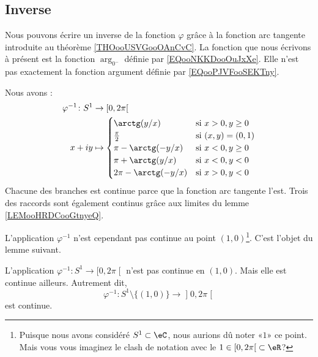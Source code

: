\subsection{Inverse}
\label{SUBSECooWFNMooOuZBRN}

Nous pouvons écrire un inverse de la fonction \( \varphi\) grâce à la fonction arc tangente introduite au théorème \ref{THOooUSVGooOAnCvC}.
La fonction que nous écrivons à présent est la fonction \( \arg_{0^{-}} \) définie par \eqref{EQooNKKDooOuJxXe}. Elle n'est pas exactement la fonction argument définie par \eqref{EQooPJVFooSEKTny}.

Nous avons :
\begin{equation}        \label{EQooSAYFooRFVSPc}
	\begin{aligned}
		\varphi^{-1}\colon S^1 & \to \mathopen[ 0 , 2\pi \mathclose[ \\
		x+iy                   & \mapsto
		\begin{cases}
			\arctg(y/x)       & \text{si } x>0,y\geq 0 \\
			\frac{ \pi }{2}   & \text{si }(x,y)=(0,1)  \\
			\pi-\arctg(-y/x)  & \text{si }x<0,y\geq 0  \\
			\pi+\arctg(y/x)   & \text{si }x<0,y<0      \\
			2\pi-\arctg(-y/x) & \text{si }x>0,y<0
		\end{cases}
	\end{aligned}
\end{equation}
Chacune des branches est continue parce que la fonction arc tangente l'est. Trois des raccords sont également continus grâce aux limites du lemme \ref{LEMooHRDCooGtnyeQ}.

L'application \( \varphi^{-1}\) n'est cependant pas continue au point \( (1,0)\)\footnote{Puisque nous avons considéré \( S^1\subset \eC\), nous aurions dû noter «\( 1\)» ce point. Mais vous vous imaginez le clash de notation avec le \( 1\in \mathopen[ 0 , 2\pi \mathclose[\subset \eR\)?}. C'est l'objet du lemme suivant.

\begin{lemma}       \label{LEMooEQVRooMAffCw}
	L'application \( \varphi^{-1}\colon S^1\to \mathopen[ 0 , 2\pi \mathclose[\) n'est pas continue en \( (1,0)\). Mais elle est continue ailleurs. Autrement dit,
	\begin{equation}
		\varphi^{-1}\colon S^1\setminus\{ (1,0) \}\to \mathopen] 0 , 2\pi \mathclose[
	\end{equation}
	est continue.
\end{lemma}

